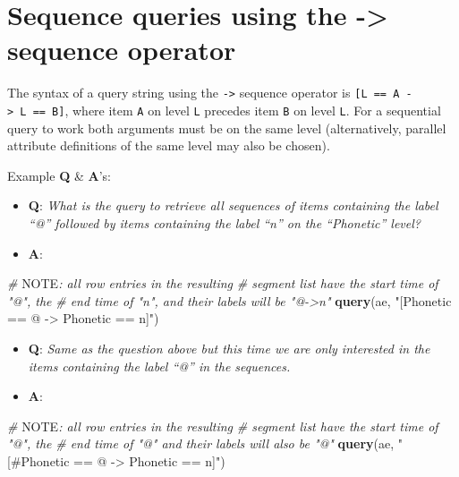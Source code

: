 \documentclass[]{book}
\newenvironment{Shaded}{\begin{snugshade}}{\end{snugshade}}
\newcommand{\AlertTok}[1]{\textcolor[rgb]{0.94,0.16,0.16}{#1}}
\newcommand{\CommentTok}[1]{\textcolor[rgb]{0.56,0.35,0.01}{\textit{#1}}}
\newcommand{\KeywordTok}[1]{\textcolor[rgb]{0.13,0.29,0.53}{\textbf{#1}}}
\newcommand{\NormalTok}[1]{#1}
\newcommand{\StringTok}[1]{\textcolor[rgb]{0.31,0.60,0.02}{#1}}
\providecommand{\tightlist}{%
  \setlength{\itemsep}{0pt}\setlength{\parskip}{0pt}}
\begin{document}
\hypertarget{sequence-queries-using-the---sequence-operator}{%
\section{Sequence queries using the -\textgreater{} sequence operator}\label{sequence-queries-using-the---sequence-operator}}

The syntax of a query string using the \texttt{-\textgreater{}} sequence operator is \texttt{{[}L\ ==\ A\ -\textgreater{}\ L\ ==\ B{]}}, where item \texttt{A} on level \texttt{L} precedes item \texttt{B} on level \texttt{L}. For a sequential query to work both arguments must be on the same level (alternatively, parallel attribute definitions of the same level may also be chosen).

Example \textbf{Q} \& \textbf{A}'s:

\begin{itemize}
\tightlist
\item
  \textbf{Q}: \emph{What is the query to retrieve all sequences of items containing the label ``@'' followed by items containing the label ``n'' on the ``Phonetic'' level?}
\item
  \textbf{A}:
\end{itemize}

\begin{Shaded}
\begin{Highlighting}[]
\CommentTok{# }\AlertTok{NOTE}\CommentTok{: all row entries in the resulting }
\CommentTok{# segment list have the start time of "@", the }
\CommentTok{# end time of "n", and their labels will be "@->n"}
\KeywordTok{query}\NormalTok{(ae, }\StringTok{"[Phonetic == @ -> Phonetic == n]"}\NormalTok{)}
\end{Highlighting}
\end{Shaded}

\begin{itemize}
\tightlist
\item
  \textbf{Q}: \emph{Same as the question above but this time we are only interested in the items containing the label ``@'' in the sequences.}
\item
  \textbf{A}:
\end{itemize}

\begin{Shaded}
\begin{Highlighting}[]
\CommentTok{# }\AlertTok{NOTE}\CommentTok{: all row entries in the resulting}
\CommentTok{# segment list have the start time of "@", the}
\CommentTok{# end time of "@" and their labels will also be "@"}
\KeywordTok{query}\NormalTok{(ae, }\StringTok{"[#Phonetic == @ -> Phonetic == n]"}\NormalTok{)}
\end{Highlighting}
\end{Shaded}
\end{document}
